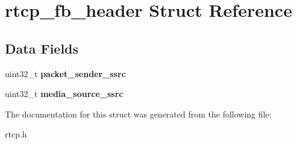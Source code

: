 \section{rtcp\+\_\+fb\+\_\+header Struct Reference}
\label{structrtcp__fb__header}
\subsection*{Data Fields}
\begin{DoxyCompactItemize}
\item 
\mbox{\label{structrtcp__fb__header_a27dccd69ea88abfa7fc99554c5d94d1b}} 
uint32\+\_\+t {\bfseries packet\+\_\+sender\+\_\+ssrc}
\item 
\mbox{\label{structrtcp__fb__header_a7035e6b35526c25130a31ed8f89002c3}} 
uint32\+\_\+t {\bfseries media\+\_\+source\+\_\+ssrc}
\end{DoxyCompactItemize}


The documentation for this struct was generated from the following file\+:\begin{DoxyCompactItemize}
\item 
rtcp.\+h\end{DoxyCompactItemize}
